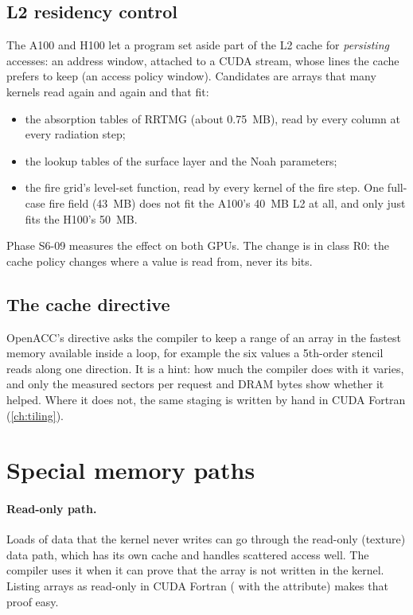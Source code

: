 \subsection{L2 residency control}

The A100 and H100 let a program set aside part of the L2 cache for \emph{persisting} accesses: an address window,
attached to a CUDA stream, whose lines the cache prefers to keep (an access policy window). Candidates are arrays that
many kernels read again and again and that fit:
\begin{itemize}
  \item the absorption tables of RRTMG (about 0.75~MB), read by every column at every radiation step;
  \item the lookup tables of the surface layer and the Noah parameters;
  \item the fire grid's level-set function, read by every kernel of the fire step. One full-case fire field
    (43~MB) does not fit the A100's 40~MB L2 at all, and only just fits the H100's 50~MB.
\end{itemize}
Phase S6-09 measures the effect on both GPUs. The change is in class R0: the cache policy changes where a value is
read from, never its bits.

\subsection{The cache directive}

OpenACC's  directive asks the compiler to keep a range of an array in the fastest memory available
inside a loop, for example the six values a 5th-order stencil reads along one direction. It is a hint: how much the
compiler does with it varies, and only the measured sectors per request and DRAM bytes show whether it helped.
Where it does not, the same staging is written by hand in CUDA Fortran (\cref{ch:tiling}).

\section{Special memory paths}

\paragraph{Read-only path.} Loads of data that the kernel never writes can go through the read-only (texture) data
path, which has its own cache and handles scattered access well. The compiler uses it when it can prove that the
array is not written in the kernel. Listing arrays as read-only in CUDA Fortran ( with the
 attribute) makes that proof easy.

